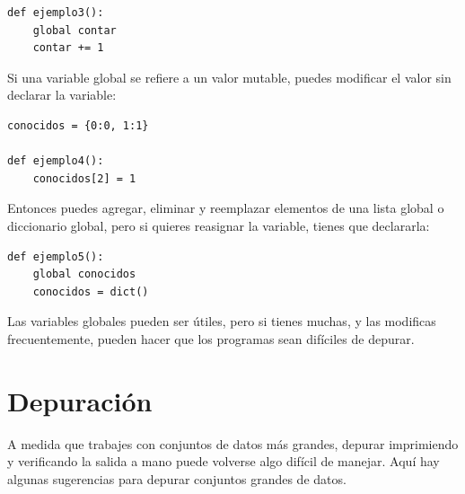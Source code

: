 \documentclass[10pt]{book}
\begin{document}
\begin{verbatim}
def ejemplo3():
    global contar
    contar += 1
\end{verbatim}
%
Si una variable global se refiere a un valor mutable, puedes modificar
el valor sin declarar la variable:

\begin{verbatim}
conocidos = {0:0, 1:1}

def ejemplo4():
    conocidos[2] = 1
\end{verbatim}
%
Entonces puedes agregar, eliminar y reemplazar elementos de una lista global o diccionario
global, pero si quieres reasignar la variable,
tienes que declararla:

\begin{verbatim}
def ejemplo5():
    global conocidos
    conocidos = dict()
\end{verbatim}
%
Las variables globales pueden ser útiles, pero si tienes muchas,
y las modificas frecuentemente, pueden hacer que los programas sean
difíciles de depurar.


\section{Depuración}

A medida que trabajes con conjuntos de datos más grandes, depurar imprimiendo y
verificando la salida a mano puede volverse algo difícil de manejar.  Aquí hay algunas
sugerencias para depurar conjuntos grandes de datos.
\end{document}
